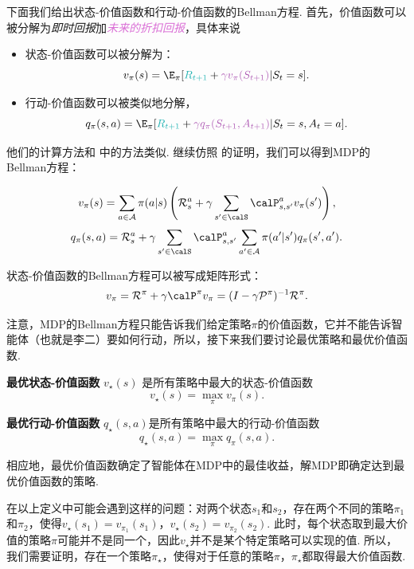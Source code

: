 下面我们给出状态-价值函数和行动-价值函数的Bellman方程. 首先，价值函数可以被分解为\textcolor{TealBlue}{\emph{即时回报}}加\textcolor{Orchid}{\emph{未来的折扣回报}}，具体来说
\begin{itemize}
    \item 状态-价值函数可以被分解为：
    \[v_\pi(s) = \E_\pi[\textcolor{TealBlue}{R_{t+1}} + \textcolor{Orchid}{\gamma v_\pi(S_{t+1})}|S_t=s].\]
    \item 行动-价值函数可以被类似地分解，
\[q_\pi(s,a) = \E_\pi[\textcolor{TealBlue}{R_{t+1}} + \textcolor{Orchid}{\gamma q_\pi(S_{t+1},A_{t+1})}|S_t=s,A_t=a].\]
\end{itemize}

他们的计算方法和 中的方法类似. 继续仿照 的证明，我们可以得到MDP的Bellman方程：

\begin{theorem}[Bellman方程]
\[v_\pi(s) = \sum_{a\in \mathcal A}\pi(a|s)\left(\mathcal R_s^a + \gamma \sum_{s'\in \calS}\calP_{s,s'}^av_\pi(s')\right),\]
\[q_\pi(s,a) = \mathcal R_s^a + \gamma \sum_{s'\in \calS}\calP_{s,s'}^a \sum_{a'\in \mathcal A}\pi(a'|s')q_\pi(s',a').\]
\end{theorem}

状态-价值函数的Bellman方程可以被写成矩阵形式：
\[v_\pi = \mathcal R^\pi + \gamma \calP^\pi v_\pi = (I-\gamma \mathcal P^\pi)^{-1}\mathcal R^\pi.\]

注意，MDP的Bellman方程只能告诉我们给定策略$\pi$的价值函数，它并不能告诉智能体（也就是李二）要如何行动，所以，接下来我们要讨论最优策略和最优价值函数. 

\begin{definition}[最优价值函数]
\textbf{最优状态-价值函数} $v_\star(s)$ 是所有策略中最大的状态-价值函数
    \[v_\star(s) = \max_\pi v_\pi(s).\]

\textbf{最优行动-价值函数} $q_\star(s,a)$是所有策略中最大的行动-价值函数
    \[q_\star(s,a) = \max_\pi q_\pi(s,a).\]
\end{definition}

相应地，最优价值函数确定了智能体在MDP中的最佳收益，解MDP即确定达到最优价值函数的策略. 

在以上定义中可能会遇到这样的问题：对两个状态$s_1$和$s_2$，存在两个不同的策略$\pi_1$和$\pi_2$，使得$v_\star(s_1)=v_{\pi_1}(s_1)$，$v_\star(s_2)=v_{\pi_2}(s_2)$. 此时，每个状态取到最大价值的策略$\pi$可能并不是同一个，因此$v_\star$并不是某个特定策略可以实现的值. 所以，我们需要证明，存在一个策略$\pi_\star$，使得对于任意的策略$\pi$，$\pi_\star$都取得最大价值函数. 

